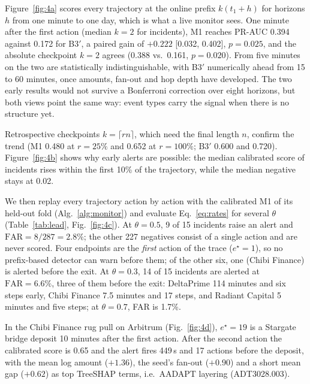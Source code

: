 \documentclass[runningheads]{llncs}
\newcommand{\1}{\mathbb{1}}
\begin{document}
Figure~\ref{fig:4a} scores every trajectory at the online prefix $k(t_1+h)$ for horizons $h$ from one minute to one day, which is what a live monitor sees.
One minute after the first action (median $k=2$ for incidents), M1 reaches PR-AUC 0.394 against 0.172 for B3$'$, a paired gain of $+0.222$ [0.032, 0.402], $p=0.025$, and the absolute checkpoint $k=2$ agrees (0.388 vs.\ 0.161, $p=0.020$).
From five minutes on the two are statistically indistinguishable, with B3$'$ numerically ahead from 15 to 60 minutes, once amounts, fan-out and hop depth have developed.
The two early results would not survive a Bonferroni correction over eight horizons, but both views point the same way: event types carry the signal when there is no structure yet.

Retrospective checkpoints $k=\lceil rn\rceil$, which need the final length $n$, confirm the trend (M1 0.480 at $r=25\%$ and 0.652 at $r=100\%$; B3$'$ 0.600 and 0.720).
Figure~\ref{fig:4b} shows why early alerts are possible: the median calibrated score of incidents rises within the first 10\% of the trajectory, while the median negative stays at 0.02.

We then replay every trajectory action by action with the calibrated M1 of its held-out fold (Alg.~\ref{alg:monitor}) and evaluate Eq.~\eqref{eq:rates} for several $\theta$ (Table~\ref{tab:lead}, Fig.~\ref{fig:4c}).
At $\theta=0.5$, 9 of 15 incidents raise an alert and $\mathrm{FAR}=8/287=2.8\%$; the other 227 negatives consist of a single action and are never scored.
Four endpoints are the \emph{first} action of the trace ($e^\star=1$), so no prefix-based detector can warn before them; of the other six, one (Chibi Finance) is alerted before the exit.
At $\theta=0.3$, 14 of 15 incidents are alerted at $\mathrm{FAR}=6.6\%$, three of them before the exit: DeltaPrime 114 minutes and six steps early, Chibi Finance 7.5 minutes and 17 steps, and Radiant Capital 5 minutes and five steps; at $\theta=0.7$, FAR is 1.7\%.

In the Chibi Finance rug pull on Arbitrum (Fig.~\ref{fig:4d}), $e^\star=19$ is a Stargate bridge deposit 10 minutes after the first action.
After the second action the calibrated score is 0.65 and the alert fires 449\,s and 17 actions before the deposit, with the mean log amount ($+1.36$), the seed's fan-out ($+0.90$) and a short mean gap ($+0.62$) as top TreeSHAP terms, i.e.\ AADAPT layering (ADT3028.003).
\end{document}
